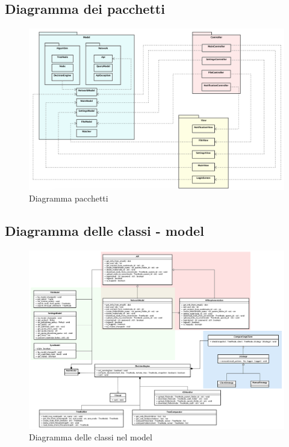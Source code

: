 \subsection{Diagramma dei pacchetti}
\begin{figure}[H]
    \centering
    \includegraphics[scale = 0.5]{components/img/diagramma-package.png}
    \caption{Diagramma pacchetti}
    \label{fig:diagramma pacchetti}
\end{figure}
\subsection{Diagramma delle classi - model}

\begin{figure}[H]
    \centering
    \includegraphics[scale = 0.6]{components/img/diagramma-classi-model.png}
    \caption{Diagramma delle classi nel model}
    \label{fig:Diagramma delle classi nel model}
\end{figure}

